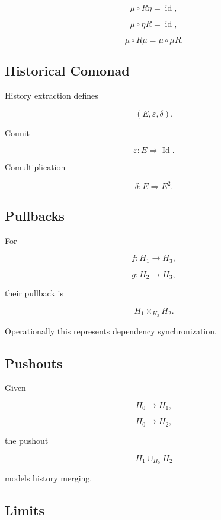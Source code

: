 \documentclass[12pt,oneside]{article}
\theoremstyle{definition}
\theoremstyle{remark}
\begin{document}
\[
\mu
\circ
R\eta
=
\operatorname{id},
\]

\[
\mu
\circ
\eta R
=
\operatorname{id},
\]

\[
\mu
\circ
R\mu
=
\mu
\circ
\mu R.
\]

\subsection*{Historical Comonad}

History extraction defines

\[
(E,\varepsilon,\delta).
\]

Counit

\[
\varepsilon
:
E
\Rightarrow
\operatorname{Id}.
\]

Comultiplication

\[
\delta
:
E
\Rightarrow
E^2.
\]

\subsection*{Pullbacks}

For

\[
f:H_1\rightarrow H_3,
\]

\[
g:H_2\rightarrow H_3,
\]

their pullback is

\[
H_1
\times_{H_3}
H_2.
\]

Operationally this represents dependency synchronization.

\subsection*{Pushouts}

Given

\[
H_0
\rightarrow
H_1,
\]

\[
H_0
\rightarrow
H_2,
\]

the pushout

\[
H_1
\cup_{H_0}
H_2
\]

models history merging.

\subsection*{Limits}
\end{document}
